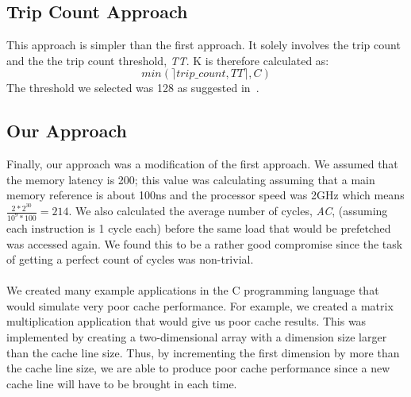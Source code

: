 \documentclass[11pt]{article}
\begin{document}
  \subsection{Trip Count Approach}
  This approach is simpler than the first approach. It solely involves the trip count and the the trip count threshold, \textit{TT}. K is therefore calculated as:
  \begin{equation}
    min(\rceil trip\_count, TT\rceil, C)
    \label{eqn:trip_count_approach}
  \end{equation}
  The threshold we selected was 128 as suggested in~\cite{Wu2002}. 

  \subsection{Our Approach}
  \label{sec:our_approach}
  Finally, our approach was a modification of the first approach. We assumed that the memory latency is 200; this value was calculating assuming that a main memory reference is about 100ns and the processor speed was 2GHz which means \(\frac{2*2^{30}}{10^9*100} = 214\). We also calculated the average number of cycles, \textit{AC}, (assuming each instruction is 1 cycle each) before the same load that would be prefetched was accessed again. We found this to be a rather good compromise since the task of getting a perfect count of cycles was non-trivial.
  \\\\We created many example applications in the C programming language that would simulate very poor cache performance. For example, we created a matrix multiplication application that would give us poor cache results. This was implemented by creating a two-dimensional array with a dimension size larger than the cache line size. Thus, by incrementing the first dimension by more than the cache line size, we are able to produce poor cache performance since a new cache line will have to be
  brought in each time.
\end{document}
